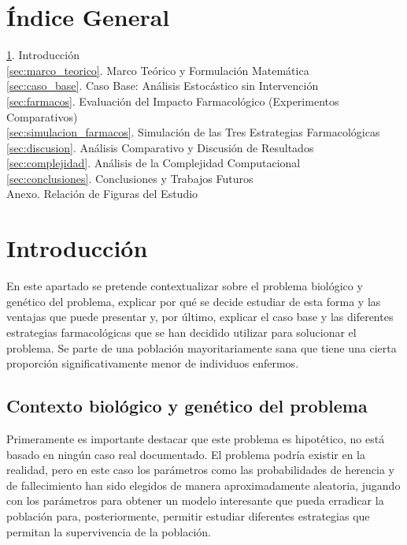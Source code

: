 \documentclass[graybox]{SNmult}
\begin{document}
	\section*{Índice General}
	\begin{description}
		\item[\ref{sec:introduccion}. Introducción] \dotfill \pageref{sec:introduccion}
		\item[\ref{sec:marco_teorico}. Marco Teórico y Formulación Matemática] \dotfill \pageref{sec:marco_teorico}
		\item[\ref{sec:caso_base}. Caso Base: Análisis Estocástico sin Intervención] \dotfill \pageref{sec:caso_base}
		\item[\ref{sec:farmacos}. Evaluación del Impacto Farmacológico (Experimentos Comparativos)] \dotfill \pageref{sec:farmacos}
		\item[\ref{sec:simulacion_farmacos}. Simulación de las Tres Estrategias Farmacológicas] \dotfill \pageref{sec:simulacion_farmacos}
		\item[\ref{sec:discusion}. Análisis Comparativo y Discusión de Resultados] \dotfill \pageref{sec:discusion}
		\item[\ref{sec:complejidad}. Análisis de la Complejidad Computacional] \dotfill \pageref{sec:complejidad}
		\item[\ref{sec:conclusiones}. Conclusiones y Trabajos Futuros] \dotfill \pageref{sec:conclusiones}
		\item[Anexo. Relación de Figuras del Estudio] \dotfill \pageref{sec:anexo}
	\end{description}
	\clearpage
	
	\section{Introducción}
	\label{sec:introduccion}
	En este apartado se pretende contextualizar sobre el problema biológico y genético del problema, explicar por qué se decide estudiar de esta forma y las ventajas que puede presentar y, por último, explicar el caso base y las diferentes estrategias farmacológicas que se han decidido utilizar para solucionar el problema. 
	Se parte de una población mayoritariamente sana que tiene una cierta proporción significativamente menor de individuos enfermos. 
	\subsection{Contexto biológico y genético del problema}
	Primeramente es importante destacar que este problema es hipotético, no está basado en ningún caso real documentado. El problema podría existir en la realidad, pero en este caso los parámetros como las probabilidades de herencia y de fallecimiento han sido elegidos de manera aproximadamente aleatoria, jugando con los parámetros para obtener un modelo interesante que pueda erradicar la población para, posteriormente, permitir estudiar diferentes estrategias que permitan la supervivencia de la población. 
	
\end{document}
